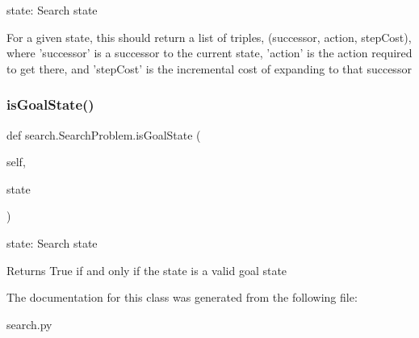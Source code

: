 \begin{DoxyVerb}  state: Search state

For a given state, this should return a list of triples,
(successor, action, stepCost), where 'successor' is a
successor to the current state, 'action' is the action
required to get there, and 'stepCost' is the incremental
cost of expanding to that successor
\end{DoxyVerb}
 \mbox{\label{classsearch_1_1_search_problem_ac856fffa6ab38abe071bde684b84b148}} 
\subsubsection{\texorpdfstring{is\+Goal\+State()}{isGoalState()}}
{\footnotesize\ttfamily def search.\+Search\+Problem.\+is\+Goal\+State (\begin{DoxyParamCaption}\item[{}]{self,  }\item[{}]{state }\end{DoxyParamCaption})}

\begin{DoxyVerb}  state: Search state

Returns True if and only if the state is a valid goal state
\end{DoxyVerb}
 

The documentation for this class was generated from the following file\+:\begin{DoxyCompactItemize}
\item 
search.\+py\end{DoxyCompactItemize}
